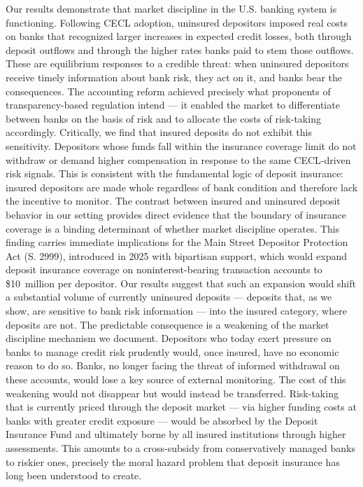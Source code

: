 Our results demonstrate that market discipline in the U.S. banking system is functioning. Following CECL adoption, uninsured depositors imposed real costs on banks that recognized larger increases in expected credit losses, both through deposit outflows and through the higher rates banks paid to stem those outflows. These are equilibrium responses to a credible threat: when uninsured depositors receive timely information about bank risk, they act on it, and banks bear the consequences. The accounting reform achieved precisely what proponents of transparency-based regulation intend — it enabled the market to differentiate between banks on the basis of risk and to allocate the costs of risk-taking accordingly.
Critically, we find that insured deposits do not exhibit this sensitivity. Depositors whose funds fall within the insurance coverage limit do not withdraw or demand higher compensation in response to the same CECL-driven risk signals. This is consistent with the fundamental logic of deposit insurance: insured depositors are made whole regardless of bank condition and therefore lack the incentive to monitor. The contrast between insured and uninsured deposit behavior in our setting provides direct evidence that the boundary of insurance coverage is a binding determinant of whether market discipline operates.
This finding carries immediate implications for the Main Street Depositor Protection Act (S. 2999), introduced in 2025 with bipartisan support, which would expand deposit insurance coverage on noninterest-bearing transaction accounts to \$10~million per depositor. Our results suggest that such an expansion would shift a substantial volume of currently uninsured deposits — deposits that, as we show, are sensitive to bank risk information — into the insured category, where deposits are not. The predictable consequence is a weakening of the market discipline mechanism we document. Depositors who today exert pressure on banks to manage credit risk prudently would, once insured, have no economic reason to do so. Banks, no longer facing the threat of informed withdrawal on these accounts, would lose a key source of external monitoring.
The cost of this weakening would not disappear but would instead be transferred. Risk-taking that is currently priced through the deposit market — via higher funding costs at banks with greater credit exposure — would be absorbed by the Deposit Insurance Fund and ultimately borne by all insured institutions through higher assessments. This amounts to a cross-subsidy from conservatively managed banks to riskier ones, precisely the moral hazard problem that deposit insurance has long been understood to create.
